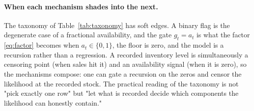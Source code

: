 \paragraph{When each mechanism shades into the next.}
The taxonomy of Table~\ref{tab:taxonomy} has soft edges. A binary flag is the degenerate case of a fractional availability, and the gate $g_t = a_t$ is what the factor \eqref{eq:factor} becomes when $a_t \in \{0,1\}$, the floor is zero, and the model is a recursion rather than a regression. A recorded inventory level is simultaneously a censoring point (when sales hit it) and an availability signal (when it is zero), so the mechanisms compose: one can gate a recursion on the zeros and censor the likelihood at the recorded stock. The practical reading of the taxonomy is not "pick exactly one row" but "let what is recorded decide which components the likelihood can honestly contain."
